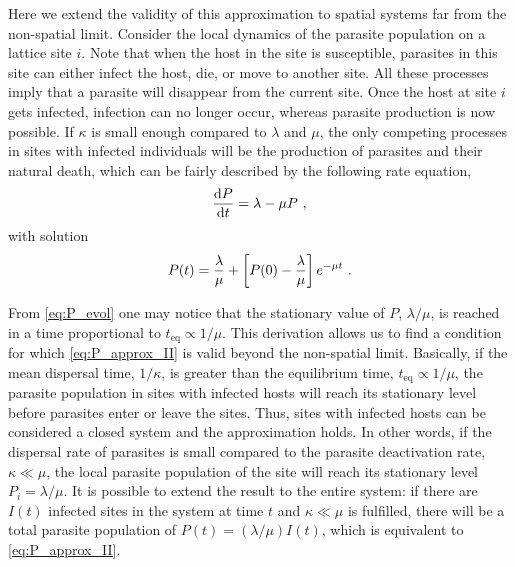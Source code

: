 Here we extend the validity of this approximation to spatial systems far
from the non-spatial limit. Consider the local dynamics of the parasite
population on a lattice site $i$. Note that when the host in the site is
susceptible, parasites in this site can either infect the host, die, or move to
another site. All these processes imply that a parasite will disappear from the
current site. Once the host at site $i$ gets infected, infection can no longer
occur, whereas parasite production is now possible. If $\kappa$ is small enough
compared to $\lambda$ and $\mu$,  the only competing processes in sites with
infected individuals will be the production of parasites and their natural
death, which can be fairly described by the following rate equation,
\begin{equation}
    \frac{\mathrm{d} P}{\mathrm{d} t}=\lambda-\mu P \ ,
\end{equation}
with solution
\begin{equation}\label{eq:P_evol}
    P(t)=\frac{\lambda}{\mu}+\left[P(0)-\frac{\lambda}{\mu}\right]e^{-\mu t}
    \ .
\end{equation}

From \cref{eq:P_evol} one may notice that the stationary value of $P$,
$\lambda/\mu$, is reached in a time proportional to $t_{\textrm{eq}}\propto
    1/\mu$. This derivation allows us to find a condition for which
\cref{eq:P_approx_II} is valid beyond the non-spatial limit. Basically, if the
mean dispersal time, $1/\kappa$, is greater than the equilibrium time,
$t_{\textrm{eq}}\propto 1/\mu$, the parasite population in sites with infected
hosts will reach its stationary level before parasites enter or leave the
sites. Thus, sites with infected hosts can be considered a closed system and
the approximation holds. In other words, if the dispersal rate of parasites is
small compared to the parasite
deactivation rate, $\kappa \ll \mu$, the local parasite population of the site
will reach its stationary level $P_i=\lambda/\mu$. It is possible to extend the
result to the entire system: if there are $I(t)$ infected sites in the system
at time $t$ and $\kappa\ll\mu$ is fulfilled, there will be a total parasite
population of $P(t)=(\lambda/\mu) I(t)$, which is equivalent to
\cref{eq:P_approx_II}.

